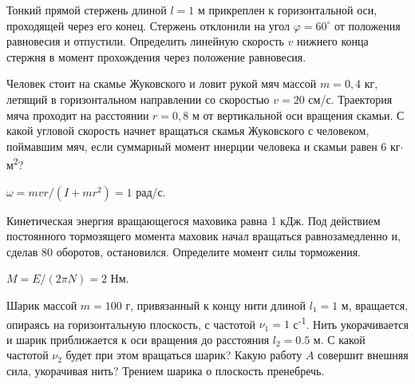 \simpleProblems

\begin{ex}
Тонкий прямой стержень длиной $l = 1$ м прикреплен к горизонтальной оси, проходящей через его конец. Стержень отклонили на угол $\varphi = 60^{\circ}$ от положения равновесия и отпустили. Определить линейную скорость $v$ нижнего конца стержня в момент прохождения через положение равновесия.
\end{ex}	

\begin{ex} %
Человек стоит на скамье Жуковского и ловит рукой мяч массой $m = 0,4$ кг, летящий в горизонтальном направлении со скоростью $v = 20$ см/с. Траектория мяча проходит на расстоянии $r=0,8$ м от вертикальной оси вращения скамьи. С какой угловой скорость начнет вращаться скамья Жуковского с человеком, поймавшим мяч, если суммарный момент инерции человека и скамьи равен 6 кг$\cdot$м\textsuperscript{2}?
\begin{ans}
$\omega = mvr/(I+mr^2) = 1$ рад/с.
\end{ans}
\end{ex}	

\begin{ex} %
Кинетическая энергия вращающегося маховика равна 1 кДж. Под действием постоянного тормозящего момента маховик начал вращаться равнозамедленно и, сделав 80 оборотов, остановился. Определите момент силы торможения.
\begin{ans}
$M = E / (2 \pi N) = 2$ Нм.
\end{ans}
\end{ex}	

\begin{ex}
Шарик массой $m = 100$ г, привязанный к концу нити длиной $l_1 = 1$ м, вращается, опираясь на горизонтальную плоскость, с частотой $\nu_1 = 1$ с\textsuperscript{-1}. Нить укорачивается и шарик приближается к оси вращения до расстояния $l_2 = 0.5$ м. С какой частотой $\nu_2$ будет при этом вращаться шарик? Какую работу $A$ совершит внешняя сила, укорачивая нить? Трением шарика о плоскость пренебречь.
\end{ex}	

